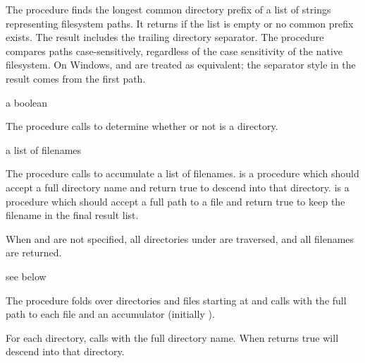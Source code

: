 The  procedure finds the longest common directory
prefix of a list of strings representing filesystem paths. It returns 
if the list is empty or no common prefix exists. The result includes the
trailing directory separator.
The procedure compares paths case-sensitively, regardless of the case sensitivity of the native filesystem.
On Windows, \code{/} and \code{\textbackslash} are
treated as equivalent; the separator style in the result comes from the first
path.

\begin{procedure}
\end{procedure}
\returns{} a boolean

The  procedure calls  to
determine whether or not  is a directory.

\begin{procedure}
\end{procedure}
\returns{} a list of filenames

The  procedure calls  to
accumulate a list of filenames.  is a procedure which
should accept a full directory name and return true to descend into
that directory.  is a procedure which should accept a
full path to a file and return true to keep the filename in the final
result list.

When  and  are not specified, all
directories under  are traversed, and all filenames are
returned.

\begin{procedure}
\end{procedure}
\returns{} see below

The  procedure folds over directories and files
starting at  and calls  with the full path to each
file and an accumulator (initially ).

For each directory,  calls  with the
full directory name. When  returns true
 will descend into that directory.


